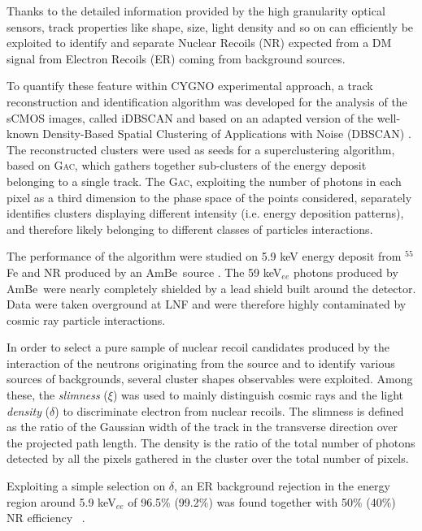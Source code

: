 \documentclass[physics,article,submit,moreauthors,pdftex]{Definitions/mdpi}
\newcommand{\ambe}{\ensuremath{\textrm{Am} \textrm{Be}}\xspace}
\newcommand{\gac}{{\textsc{Gac}}\xspace}
\begin{document}
Thanks to the detailed information provided by the high granularity optical sensors, track properties like shape, size, light density and so on can efficiently be exploited to identify and separate Nuclear Recoils (NR) expected from a DM signal from Electron Recoils (ER) coming from background sources.

To quantify these feature within CYGNO experimental approach, a track reconstruction and identification algorithm was developed for the analysis of the sCMOS images, called iDBSCAN \cite{Baracchini:2020iwg} and based on an adapted version of the well-known Density-Based Spatial Clustering of Applications with Noise (DBSCAN) \cite{dbscan1996}. The reconstructed clusters were used as seeds for a superclustering algorithm, based on \gac \cite{gac,mgac}, which gathers together sub-clusters of the energy deposit belonging to a single track. The \gac, exploiting the number of photons in each pixel as a third dimension to the phase space of the points considered, separately identifies clusters displaying different intensity (i.e. energy deposition patterns), and therefore likely belonging to different classes of particles interactions.

The performance of the algorithm were studied on 5.9 keV energy deposit from $^{55}$Fe and NR  produced by an \ambe~source \cite{bib:coronello}. The 59 keV$_{ee}$ photons produced by \ambe~were nearly completely shielded by a lead shield built around the detector. Data were taken overground at LNF and were therefore highly contaminated by cosmic ray particle interactions.


In order to  select a pure sample of nuclear recoil candidates produced by the interaction of the neutrons
originating from the source and to identify various sources of backgrounds, several cluster shapes observables were exploited. Among these, the \emph{slimness} ($\xi$) was used to mainly distinguish cosmic rays  and the light \emph{density} ($\delta$) to discriminate electron from nuclear recoils. The slimness is defined as the ratio of the Gaussian width of the track in the transverse direction over the projected path length. The density is the ratio of the total number of photons detected by all the pixels gathered in the cluster over the total number of pixels. 

Exploiting a simple selection on $\delta$,  an ER background rejection in the energy region around 5.9 keV$_{ee}$ of 96.5$\%$ (99.2$\%$) was found together with  50$\%$ (40$\%$) NR efficiency ~\cite{bib:coronello}.
\end{document}
